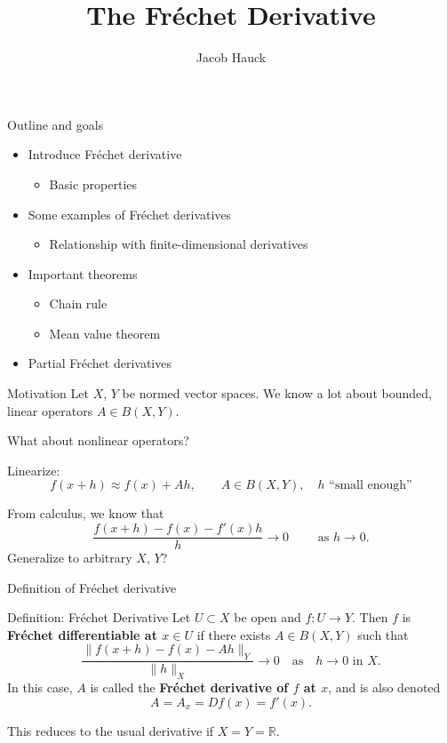 \documentclass[]{beamer}
\title{The Fréchet Derivative}
\author{Jacob Hauck}
\institute{Math 6418}
\date{}
\begin{document}
	\frame{\titlepage}
	
	\begin{frame}{Outline and goals}
		\begin{itemize}
			\item Introduce Fréchet derivative
			\begin{itemize}
				\item Basic properties
			\end{itemize}
			\vfill
			\item Some examples of Fréchet derivatives 
			\begin{itemize}
				\item Relationship with finite-dimensional derivatives
			\end{itemize}
			\vfill
			\item Important theorems
			\begin{itemize}
				\item Chain rule
				\item Mean value theorem
			\end{itemize}
			\vfill
			\item Partial Fréchet derivatives
		\end{itemize}
	\end{frame}
	
	\begin{frame}{Motivation}
		Let $X$, $Y$ be normed vector spaces. We know a lot about bounded, linear operators $A \in B(X,Y)$.
		
		\vfill
		What about nonlinear operators?
		\vfill
		
		Linearize:
		\begin{equation*}
			f(x+h) \approx f(x) + Ah, \qquad A \in B(X,Y),\quad h \text{ ``small enough''}
		\end{equation*}
		\vfill
		
		From calculus, we know that
		\begin{equation*}
			\frac{f(x+h) - f(x) - f'(x)h}{h} \to 0 \qquad \text{ as } h \to 0.
		\end{equation*}
		Generalize to arbitrary $X$, $Y$?
	\end{frame}
	
	\begin{frame}{Definition of Fréchet derivative}
		\begin{block}{Definition: Fréchet Derivative}
			Let $U \subset X$ be open and $f: U \to Y$. Then $f$ is \textbf{Fréchet differentiable at $x\in U$} if there exists $A \in B(X,Y)$ such that
			\begin{equation*}
				\frac{\lVert f(x+h) - f(x) - Ah\rVert_Y}{\lVert h \rVert_X} \to 0\quad \text{as}\quad h \to 0 \text{ in $X$}.
			\end{equation*}
			In this case, $A$ is called the \textbf{Fréchet derivative of $f$ at $x$}, and is also denoted
			\begin{equation*}
				A = A_x = Df(x) = f'(x).
			\end{equation*}
		\end{block}
		\vfill
		
		This reduces to the usual derivative if $X = Y = \mathbb{R}$.
	\end{frame}
	
\end{document}
